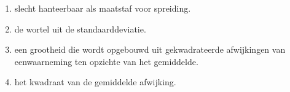 \begin{enumerate}[label=(\alph*)]
    \item slecht hanteerbaar als maatstaf voor spreiding.
    \item de wortel uit de standaarddeviatie.
    \item een grootheid die wordt opgebouwd uit gekwadrateerde afwijkingen van eenwaarneming ten opzichte van het gemiddelde.
    \item het kwadraat van de gemiddelde afwijking.
\end{enumerate}
